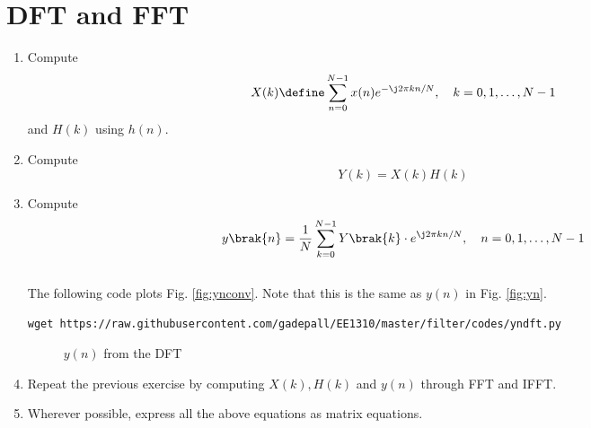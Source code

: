 \documentclass[journal,12pt,twocolumn]{IEEEtran}
\renewcommand\thesection{\arabic{section}}
\begin{document}
\section{DFT and FFT}
\begin{enumerate}[label=\thesection.\arabic*]
\item
Compute
\begin{equation}
X(k) \define \sum _{n=0}^{N-1}x(n) e^{-\j2\pi kn/N}, \quad k = 0,1,\dots, N-1
\end{equation}
and $H(k)$ using $h(n)$.
\item Compute 
\begin{equation}
Y(k) = X(k)H(k)
\end{equation}
\item Compute
\begin{equation}
 y\brak{n}={\frac {1}{N}}\sum _{k=0}^{N-1}Y\brak{k}\cdot e^{\j 2\pi kn/N},\quad n = 0,1,\dots, N-1
\end{equation}
\\
\solution The following code plots Fig. \ref{fig:ynconv}. Note that this is the same as 
$y(n)$ in  Fig. 
\ref{fig:yn}. 
%
\begin{lstlisting}
wget https://raw.githubusercontent.com/gadepall/EE1310/master/filter/codes/yndft.py
\end{lstlisting}
\begin{figure}[!ht]
\centering
\caption{$y(n)$ from the DFT}
\label{fig:yndft}
\end{figure}
\item Repeat the previous exercise by computing $X(k), H(k)$ and $y(n)$ through FFT and 
IFFT.
\item Wherever possible, express all the above equations as matrix equations.
\end{enumerate}
\end{document}
